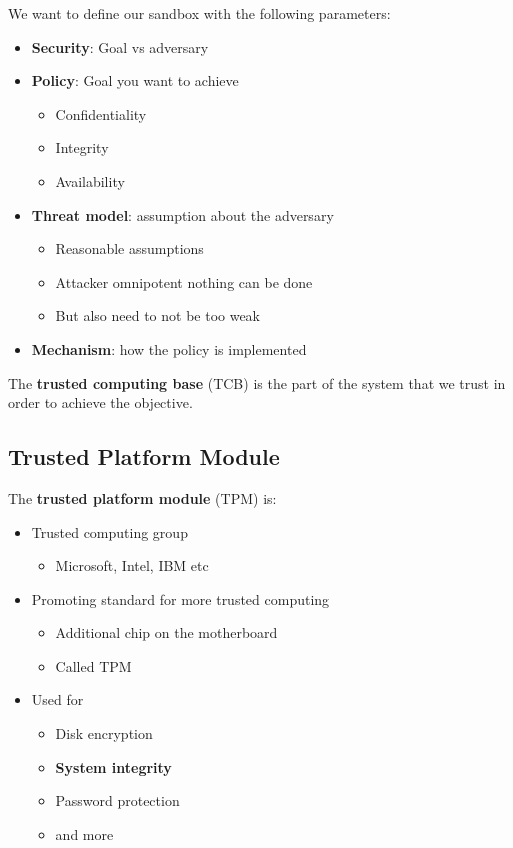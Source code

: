 \documentclass[11pt,a4paper,titlepage,dvipsnames,cmyk]{scrartcl}
\begin{document}
We want to define our sandbox with the following parameters:
\begin{itemize}
    \item \textbf{Security}: Goal vs adversary
    \item \textbf{Policy}: Goal you want to achieve
    \begin{itemize}
        \item Confidentiality
        \item Integrity
        \item Availability
    \end{itemize}
    \item \textbf{Threat model}: assumption about the adversary
    \begin{itemize}
        \item Reasonable assumptions
        \item Attacker omnipotent nothing can be done
        \item But also need to not be too weak
    \end{itemize}
    \item \textbf{Mechanism}: how the policy is implemented
\end{itemize}

The \textbf{trusted computing base} (TCB) is the part of the system that we trust in order to achieve the objective.

\subsection{Trusted Platform Module}
The \textbf{trusted platform module} (TPM) is:
\begin{itemize}
    \item Trusted computing group
    \begin{itemize}
        \item Microsoft, Intel, IBM etc
    \end{itemize}
    \item Promoting standard for more trusted computing
    \begin{itemize}
        \item Additional chip on the motherboard
        \item Called TPM
    \end{itemize}
    \item Used for 
    \begin{itemize}
        \item Disk encryption
        \item \textbf{System integrity}
        \item Password protection
        \item and more
    \end{itemize}
\end{itemize}
\end{document}
